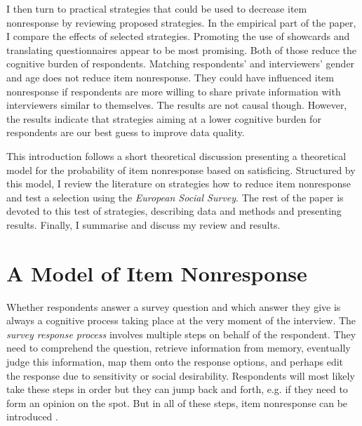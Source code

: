 \documentclass[a4paper,12pt]{article}
\begin{document}
I then turn to practical strategies that could be used to decrease item nonresponse by reviewing proposed strategies. In the empirical part of the paper, I compare the effects of selected strategies. Promoting the use of showcards and translating questionnaires appear to be most promising. Both of those reduce the cognitive burden of respondents. Matching respondents' and interviewers' gender and age does not reduce item nonresponse. They could have influenced item nonresponse if respondents are more willing to share private information with interviewers similar to themselves. The results are not causal though. However, the results indicate that strategies aiming at a lower cognitive burden for respondents are our best guess to improve data quality.

This introduction follows a short theoretical discussion presenting a theoretical model for the probability of item nonresponse based on satisficing. Structured by this model, I review the literature on strategies how to reduce item nonresponse and test a selection using the \textit{European Social Survey}. The rest of the paper is devoted to this test of strategies, describing data and methods and presenting results. Finally, I summarise and discuss my review and results.


\section{A Model of Item Nonresponse}

Whether respondents answer a survey question and which answer they give is always a cognitive process taking place at the very moment of the interview. The \textit{survey response process} \citep{tourangeauPsychologySurveyResponse2000} involves multiple steps on behalf of the respondent. They need to comprehend the question, retrieve information from memory, eventually judge this information, map them onto the response options, and perhaps edit the response due to sensitivity or social desirability. Respondents will most likely take these steps in order but they can jump back and forth, e.g. if they need to form an opinion on the spot. But in all of these steps, item nonresponse can be introduced \citep{deleeuwPreventionTreatmentItem2003}.
\end{document}

